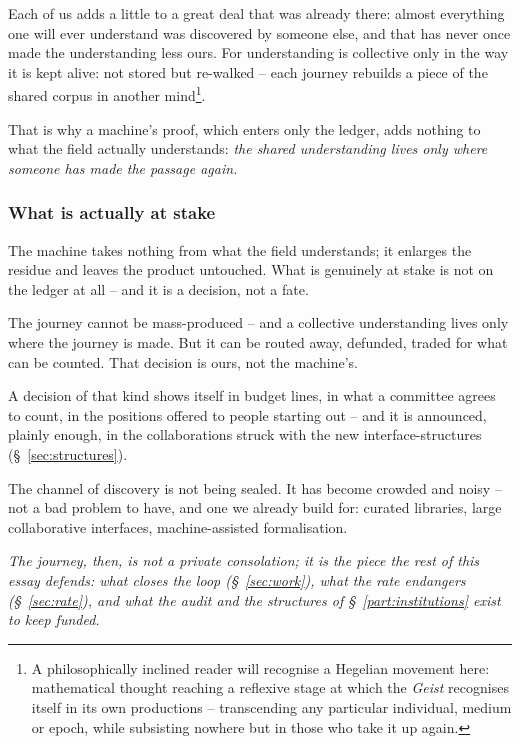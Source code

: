 \documentclass[11pt, a4paper,twosided]{amsart}
\newcommand{\key}[1]{\emph{#1}}
\begin{document}
Each of us adds a little to a great deal that was already there: almost everything one will ever understand was discovered by someone else, and that has never once made the understanding less ours. For understanding is collective only in the way it is kept alive: not stored but re-walked -- each journey rebuilds a piece of the shared corpus in another mind\footnote{A philosophically inclined reader will recognise a Hegelian movement here: mathematical thought reaching a reflexive stage at which the \emph{Geist} recognises itself in its own productions -- transcending any particular individual, medium or epoch, while subsisting nowhere but in those who take it up again.}. 

That is why a machine's proof, which enters only the ledger, adds nothing to what the field actually understands: \key{the shared understanding lives only where someone has made the passage again.}

\subsubsection{What is actually at stake}

The machine takes nothing from what the field understands; it enlarges the residue and leaves the product untouched. What is genuinely at stake is not on the ledger at all -- and it is a decision, not a fate.

\begin{pullquote}
  The journey cannot be mass-produced -- and a collective understanding lives only where the journey is made. But it can be routed away, defunded, traded for what can be counted. That decision is ours, not the machine's.
\end{pullquote}

A decision of that kind shows itself in budget lines, in what a committee agrees to count, in the positions offered to people starting out -- and it is announced, plainly enough, in the collaborations struck with the new interface-structures (\S~\ref{sec:structures}).

The channel of discovery is not being sealed. It has become crowded and noisy -- not a bad problem to have, and one we already build for: curated libraries, large collaborative interfaces, machine-assisted formalisation.

{\itshape The journey, then, is not a private consolation; it is the piece the rest of this essay defends: what closes the loop (\S~\ref{sec:work}), what the rate endangers (\S~\ref{sec:rate}), and what the audit and the structures of \S~\ref{part:institutions} exist to keep funded.}
\end{document}
